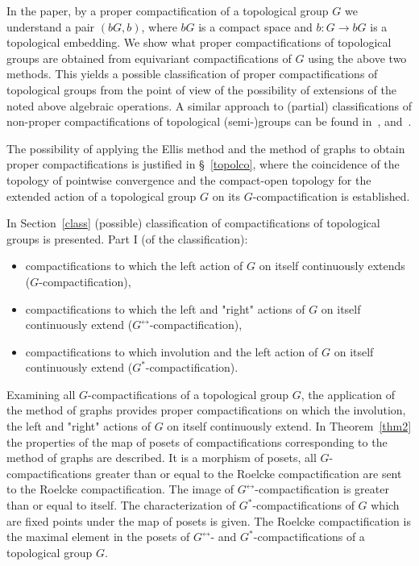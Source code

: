 \documentclass{amsart}
\begin{document}
\medskip

In the paper, by a proper compactification of a topological group $G$ we understand a pair $(b G, b)$, where $b G$ is a compact space and $b: G\to b G$ is a topological embedding. We show what proper compactifications of topological groups are obtained from equivariant compactifications of $G$ using the above two methods. This yields a possible classification of proper compactifications of topological groups from the point of view of the possibility of extensions of the noted above algebraic operations. A similar approach to (partial) classifications of non-proper compactifications of topological (semi-)groups can be found in~\cite[Ch.~3, \S\ 3.3]{BergJungMiln76}, \cite[Ch. 21]{HS} and~\cite{BITsankov}.

\medskip 

The possibility of applying the Ellis method and the method of graphs to obtain proper compactifications is justified in \S\ \ref{topolco}, where the coincidence of the topology of pointwise convergence and the compact-open topology for the extended action of a topological group $G$ on its $G$-compactification is established. 

In Section~\ref{class} (possible) classification of compactifications of topological groups is presented. Part I  (of the classification):
\begin{itemize}
\item compactifications to which the left action of $G$ on itself continuously extends ($G$-compactification),
\item compactifications to which the left and "right" actions of $G$ on itself continuously extend  ($G^{\leftrightarrow}$-compactification),
\item compactifications to which involution and the left action of $G$ on itself continuously extend ($G^*$-compactification).
\end{itemize}
Examining all $G$-compactifications of a topological group $G$, the application of the method of graphs provides proper compactifications on which the involution, the left and "right" actions of $G$ on itself continuously extend. In Theorem~\ref{thm2} the properties of the map of posets of compactifications corresponding to the method of graphs are described. It is a morphism of posets, all $G$-compactifications greater than or equal to the Roelcke compactification are sent to the Roelcke compactification. The image of $G^{\leftrightarrow}$-compactification is greater than or equal to itself. The characterization of $G^*$-compactifications of $G$ which are fixed points under the map of posets is given. The Roelcke compactification is the maximal element in the posets of $G^{\leftrightarrow}$- and $G^*$-compactifications of a topological group $G$. 
\end{document}
